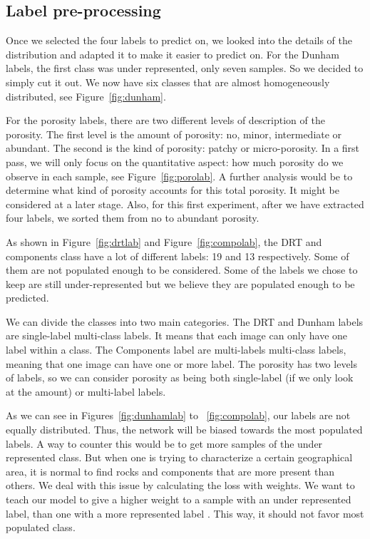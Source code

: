 \subsection{Label pre-processing}
Once we selected the four labels to predict on, we looked into the details of the distribution and adapted it to make it easier to predict on. For the Dunham labels, the first class was under represented, only seven samples. So we decided to simply cut it out. We now have six classes that are almost homogeneously distributed, see Figure~\ref{fig:dunham}. 

For the porosity labels, there are two different levels of description of the porosity. The first level is the amount of porosity: no, minor, intermediate or abundant. The second is the kind of porosity: patchy or micro-porosity. In a first pass, we will only focus on the quantitative aspect: how much porosity do we observe in each sample, see Figure~\ref{fig:porolab}. A further analysis would be to determine what kind of porosity accounts for this total porosity. It might be considered at a later stage. Also, for this first experiment, after we have extracted four labels, we sorted them from no to abundant porosity. 

As shown in Figure~\ref{fig:drtlab} and Figure~\ref{fig:compolab}, the DRT and components class have a lot of different labels: 19 and 13 respectively. Some of them are not populated enough to be considered. Some of the labels we chose to keep are still under-represented but we believe they are populated enough to be predicted.

We can divide the classes into two main categories. The DRT and Dunham labels are single-label multi-class labels. It means that each image can only have one label within a class. The Components label are multi-labels multi-class labels, meaning that one image can have one or more label. The porosity has two levels of labels, so we can consider porosity as being both single-label (if we only look at the amount) or multi-label labels. 


As we can see in Figures~\ref{fig:dunhamlab} to ~\ref{fig:compolab}, our labels are not equally distributed. Thus, the network will be biased towards the most populated labels. A way to counter this would be to get more samples of the under represented class. But when one is trying to characterize a certain geographical area, it is normal to find rocks and components that are more present than others. We deal with this issue by calculating the loss with weights. We want to teach our model to give a higher weight to a sample with an under represented label, than one with a more represented label . This way, it should not favor most populated class. 

